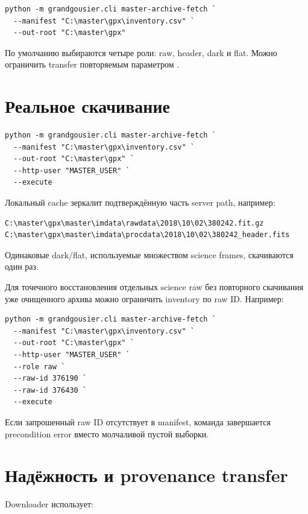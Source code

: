 \begin{lstlisting}
python -m grandgousier.cli master-archive-fetch `
  --manifest "C:\master\gpx\inventory.csv" `
  --out-root "C:\master\gpx"
\end{lstlisting}

По умолчанию выбираются четыре роли: raw, header, dark и flat. Можно ограничить transfer повторяемым параметром .

\section{Реальное скачивание}

\begin{lstlisting}
python -m grandgousier.cli master-archive-fetch `
  --manifest "C:\master\gpx\inventory.csv" `
  --out-root "C:\master\gpx" `
  --http-user "MASTER_USER" `
  --execute
\end{lstlisting}

Локальный cache зеркалит подтверждённую часть server path, например:

\begin{verbatim}
C:\master\gpx\master\imdata\rawdata\2018\10\02\380242.fit.gz
C:\master\gpx\master\imdata\procdata\2018\10\02\380242_header.fits
\end{verbatim}

Одинаковые dark/flat, используемые множеством science frames, скачиваются один раз.

Для точечного восстановления отдельных science raw без повторного скачивания уже очищенного архива можно ограничить inventory по raw ID. Например:

\begin{lstlisting}
python -m grandgousier.cli master-archive-fetch `
  --manifest "C:\master\gpx\inventory.csv" `
  --out-root "C:\master\gpx" `
  --http-user "MASTER_USER" `
  --role raw `
  --raw-id 376190 `
  --raw-id 376430 `
  --execute
\end{lstlisting}

Если запрошенный raw ID отсутствует в manifest, команда завершается precondition error вместо молчаливой пустой выборки.

\section{Надёжность и provenance transfer}

Downloader использует:

